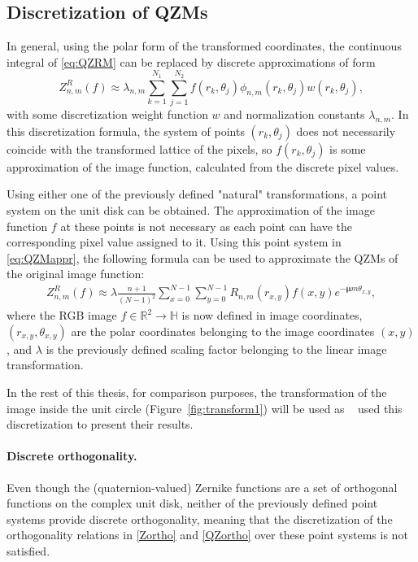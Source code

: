 \subsection{Discretization of QZMs}
In general, using the polar form of the transformed coordinates, the continuous integral of \eqref{eq:QZRM} can be replaced by discrete approximations of form
\begin{equation}\label{eq:QZMappr}
	Z_{n,m}^R(f) \approx \lambda_{n,m} \sum_{k=1}^{N_1} \sum_{j=1}^{N_2} f(r_k,\theta_j) \phi_{n,m}(r_k,\theta_j) w(r_k,\theta_j),
\end{equation}
with some discretization weight function $w$ and normalization constants $\lambda_{n,m}$. In this discretization formula, the system of points $(r_k,\theta_j)$ does not necessarily coincide with the transformed lattice of the pixels, so $f(r_k,\theta_j)$ is some approximation of the image function, calculated from the discrete pixel values.


Using either one of the previously defined "natural" transformations, a point system on the unit disk can be obtained. The approximation of the image function $f$ at these points is not necessary as each point can have the corresponding pixel value assigned to it. Using this point system in \eqref{eq:QZMappr}, the following formula can be used to approximate the QZMs of the original image function:
\begin{gather*}
    Z_{n,m}^R(f) \approx \lambda\frac{n + 1}{(N - 1)^2}\sum_{x = 0}^{N-1}\sum_{y = 0}^{N-1}R_{n,m}(r_{x,y})f(x,y)e^{-\bm{\mu}m\theta_{x,y}},
\end{gather*}
where the RGB image $f \in \mathds{R}^2 \rightarrow \mathds{H}$ is now defined in image coordinates, $(r_{x,y},\theta_{x,y})$ are the polar coordinates belonging to the image coordinates $(x,y)$, and $\lambda$ is the previously defined scaling factor belonging to the linear image transformation.

In the rest of this thesis, for comparison purposes, the transformation of the image inside the unit circle (Figure~\ref{fig:transform1}) will be used as \citeauthor{qzmi}~\cite{qzmi} used this discretization to present their results.

\paragraph{Discrete orthogonality.}
Even though the (quaternion-valued) Zernike functions are a set of orthogonal functions on the complex unit disk, neither of the previously defined point systems provide discrete orthogonality, meaning that the discretization of the orthogonality relations in \eqref{Zortho} and \eqref{QZortho} over these point systems is not satisfied.


